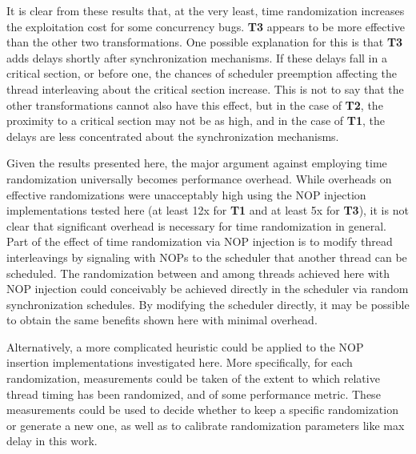 It is clear from these results that, at the very least, time randomization increases the exploitation cost for some concurrency bugs.
\textbf{T3} appears to be more effective than the other two transformations.
One possible explanation for this is that \textbf{T3} adds delays shortly after synchronization mechanisms.
If these delays fall in a critical section, or before one, the chances of scheduler preemption affecting the thread interleaving about the critical section increase.
This is not to say that the other transformations cannot also have this effect, but in the case of \textbf{T2}, the proximity to a critical section may not be as high, and in the case of \textbf{T1}, the delays are less concentrated about the synchronization mechanisms.

Given the results presented here, the major argument against employing time randomization universally becomes performance overhead.
While overheads on effective randomizations were unacceptably high using the NOP injection implementations tested here (at least 12x for \textbf{T1} and at least 5x for \textbf{T3}), it is not clear that significant overhead is necessary for time randomization in general.
Part of the effect of time randomization via NOP injection is to modify thread interleavings by signaling with NOPs to the scheduler that another thread can be scheduled.
The randomization between and among threads achieved here with NOP injection could conceivably be achieved directly in the scheduler via random synchronization schedules.
By modifying the scheduler directly, it may be possible to obtain the same benefits shown here with minimal overhead.

Alternatively, a more complicated heuristic could be applied to the NOP insertion implementations investigated here.
More specifically, for each randomization, measurements could be taken of the extent to which relative thread timing has been randomized, and of some performance metric.
These measurements could be used to decide whether to keep a specific randomization or generate a new one, as well as to calibrate randomization parameters like max delay in this work.